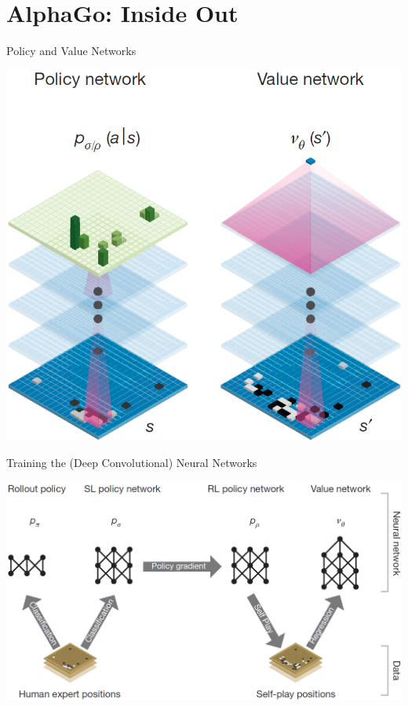 \documentclass{beamer}
\begin{document}

  \section{AlphaGo: Inside Out}
  {
    \begin{frame}{Policy and Value Networks}
      \begin{center}
        \includegraphics[height=.85\textheight]{../img/policy_and_value_network.png}
      \end{center}
    \end{frame}

    \begin{frame}{Training the (Deep Convolutional) Neural Networks}
      \begin{center}
        \includegraphics[width=\textwidth]{../img/neural_nets_pipeline.png}
      \end{center}
    \end{frame}

}
\end{document}

